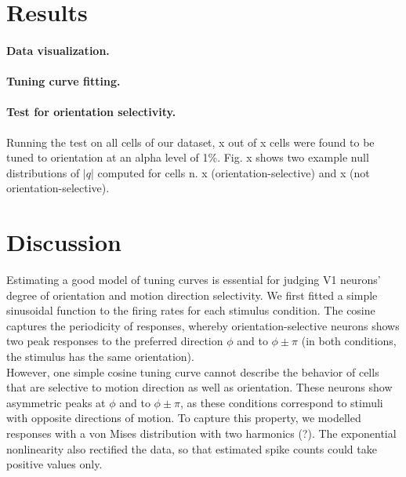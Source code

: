 \documentclass[10pt]{article}
\begin{document}
\section*{Results}
 
\paragraph{Data visualization.} 

\paragraph{Tuning curve fitting.}

\paragraph{Test for orientation selectivity.} Running the test on all cells of our dataset, x out of x cells were found to be tuned to orientation at an alpha level of 1\%. Fig. x shows two example null distributions of $|q|$ computed for cells n. x (orientation-selective) and x (not orientation-selective).

 
\section*{Discussion}

Estimating a good model of tuning curves is essential for judging V1 neurons' degree of orientation and motion direction selectivity. We first fitted a simple sinusoidal function to the firing rates for each stimulus condition. The cosine captures the periodicity of responses, whereby orientation-selective neurons shows two peak responses to the preferred direction $\phi$ and to $\phi \pm \pi$ (in both conditions, the stimulus has the same orientation). \\

However, one simple cosine tuning curve cannot describe the behavior of cells that are selective to motion direction as well as orientation. These neurons show asymmetric peaks at $\phi$ and to $\phi \pm \pi$, as these conditions correspond to stimuli with opposite directions of motion. To capture this property, we modelled responses with a von Mises distribution with two harmonics (?). The exponential nonlinearity also rectified the data, so that estimated spike counts could take positive values only. \\
\end{document}
